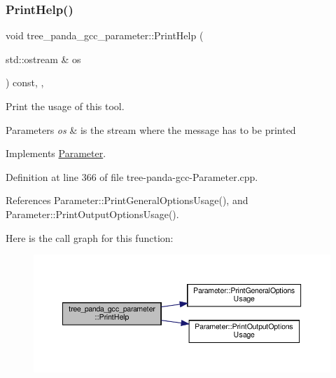 \subsubsection{\texorpdfstring{Print\+Help()}{PrintHelp()}}
{\footnotesize\ttfamily void tree\+\_\+panda\+\_\+gcc\+\_\+parameter\+::\+Print\+Help (\begin{DoxyParamCaption}\item[{std\+::ostream \&}]{os }\end{DoxyParamCaption}) const\hspace{0.3cm}{\ttfamily [override]}, {\ttfamily [private]}, {\ttfamily [virtual]}}



Print the usage of this tool. 


\begin{DoxyParams}{Parameters}
{\em os} & is the stream where the message has to be printed \\
\hline
\end{DoxyParams}


Implements \hyperlink{classParameter_a804e04bcbc2eca07deed52e112fa3321}{Parameter}.



Definition at line 366 of file tree-\/panda-\/gcc-\/\+Parameter.\+cpp.



References Parameter\+::\+Print\+General\+Options\+Usage(), and Parameter\+::\+Print\+Output\+Options\+Usage().

Here is the call graph for this function\+:
\nopagebreak
\begin{figure}[H]
\begin{center}
\leavevmode
\includegraphics[width=350pt]{da/df6/classtree__panda__gcc__parameter_a7e40c5706de9fa5cd9fbb231876feb75_cgraph}
\end{center}
\end{figure}
\mbox{\label{classtree__panda__gcc__parameter_a7ebd9a0cc0edb4bfb56c3df8cac4d87c}} 
